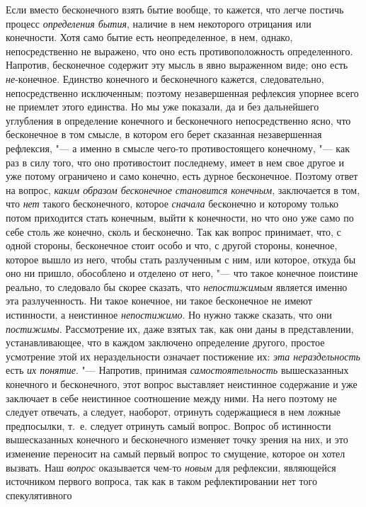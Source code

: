 Если вместо бесконечного взять бытие вообще, то кажется, что легче постичь
процесс {\em определения бытия}, наличие в нем
некоторого отрицания или конечности. Хотя само бытие есть неопределенное, в
нем, однако, непосредственно не выражено, что оно есть противоположность
определенного. Напротив, бесконечное содержит эту мысль в явно выраженном
виде; оно есть {\em не}{}-конечное. Единство конечного
и бесконечного кажется, следовательно, непосредственно исключенным; поэтому
незавершенная рефлексия упорнее всего не приемлет этого единства. Но мы уже
показали, да и без дальнейшего углубления в определение конечного и
бесконечного непосредственно ясно, что бесконечное в том смысле, в котором
его берет сказанная незавершенная рефлексия, "--- а именно в смысле чего-то
противостоящего конечному, "--- как раз в силу того, что оно противостоит
последнему, имеет в нем свое другое и уже потому ограничено и само конечно,
есть дурное бесконечное. Поэтому ответ на вопрос,
{\em каким образом бесконечное становится конечным},
заключается в том, что {\em нет} такого бесконечного,
которое {\em сначала} бесконечно и которому только
потом приходится стать конечным, выйти к конечности, но что оно уже само по
себе столь же конечно, сколь и бесконечно. Так как вопрос принимает, что, с
одной стороны, бесконечное стоит особо и что, с другой стороны, конечное,
которое вышло из него, чтобы стать разлученным с ним, или которое, откуда
бы оно ни пришло, обособлено и отделено от него, "--- что такое конечное
поистине реально, то следовало бы скорее сказать, что
{\em непостижимым} является именно эта разлученность.
Ни такое конечное, ни такое бесконечное не имеют истинности, а неистинное
{\em непостижимо}. Но нужно также сказать, что они
{\em постижимы}. Рассмотрение их, даже взятых так, как
они даны в представлении, устанавливающее, что в каждом заключено
определение другого, простое усмотрение этой их нераздельности означает
постижение их: {\em эта нераздельность} есть
{\em их понятие}. "--- Напротив, принимая
{\em самостоятельность} вышесказанных конечного и
бесконечного, этот вопрос выставляет неистинное содержание и уже заключает
в себе неистинное соотношение между ними. На него поэтому не следует
отвечать, а следует, наоборот, отринуть содержащиеся в нем ложные
предпосылки, т.~е. следует отринуть самый вопрос. Вопрос об истинности
вышесказанных конечного и бесконечного изменяет точку зрения на них, и это
изменение переносит на самый первый вопрос то смущение, которое он хотел
вызвать. Наш {\em вопрос} оказывается чем-то
{\em новым} для рефлексии, являющейся источником
первого вопроса, так как в таком рефлектировании нет того спекулятивного
